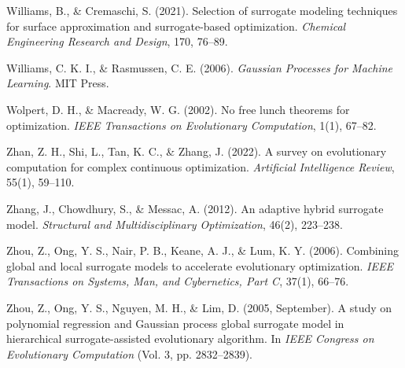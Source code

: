 \documentclass[sigconf,nonacm]{acmart}
\begin{document}
\begin{enumerate}[label={[\arabic*]}]
\item Williams, B., \& Cremaschi, S. (2021). Selection of surrogate modeling techniques for surface approximation and surrogate-based optimization. \textit{Chemical Engineering Research and Design}, 170, 76--89.

\item Williams, C. K. I., \& Rasmussen, C. E. (2006). \textit{Gaussian Processes for Machine Learning}. MIT Press.

\item Wolpert, D. H., \& Macready, W. G. (2002). No free lunch theorems for optimization. \textit{IEEE Transactions on Evolutionary Computation}, 1(1), 67--82.

\item Zhan, Z. H., Shi, L., Tan, K. C., \& Zhang, J. (2022). A survey on evolutionary computation for complex continuous optimization. \textit{Artificial Intelligence Review}, 55(1), 59--110.

\item Zhang, J., Chowdhury, S., \& Messac, A. (2012). An adaptive hybrid surrogate model. \textit{Structural and Multidisciplinary Optimization}, 46(2), 223--238.

\item Zhou, Z., Ong, Y. S., Nair, P. B., Keane, A. J., \& Lum, K. Y. (2006). Combining global and local surrogate models to accelerate evolutionary optimization. \textit{IEEE Transactions on Systems, Man, and Cybernetics, Part C}, 37(1), 66--76.

\item Zhou, Z., Ong, Y. S., Nguyen, M. H., \& Lim, D. (2005, September). A study on polynomial regression and Gaussian process global surrogate model in hierarchical surrogate-assisted evolutionary algorithm. In \textit{IEEE Congress on Evolutionary Computation} (Vol. 3, pp. 2832--2839).

\end{enumerate}
\end{document}
